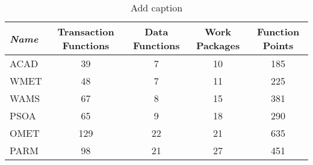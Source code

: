 \begin{table}[htbp]
  \centering
  \caption{Add caption}
    \begin{tabular}{lcccc}
    \toprule
    \textit{\textbf{Name}} & \textbf{Transaction Functions} & \textbf{Data Functions} & \textbf{Work Packages} & \textbf{Function Points} \\
    \midrule
    ACAD  & 39    & 7     & 10    & 185 \\
    WMET  & 48    & 7     & 11    & 225 \\
    WAMS  & 67    & 8     & 15    & 381 \\
    PSOA  & 65    & 9     & 18    & 290 \\
    OMET  & 129   & 22    & 21    & 635 \\
    PARM  & 98    & 21    & 27    & 451 \\
    \bottomrule
    \end{tabular}%
  \label{tab:addlabel}%
\end{table}%

